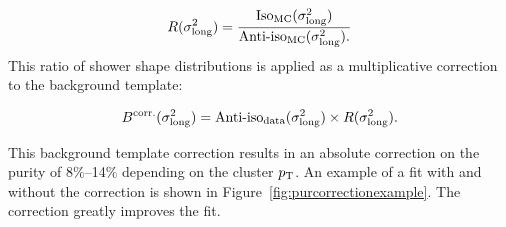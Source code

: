 
\begin{equation}
    R(\sigma^{2}_{\mathrm{long}})=\frac{\text{Iso}_{\text{MC}}(\sigma^{2}_{\mathrm{long}})}{\text{Anti-iso}_{\text{MC}}(\sigma^{2}_{\mathrm{long}}).}
    \label{eq:bkgtemplateweights}
\end{equation}
This ratio of shower shape distributions is applied as a multiplicative correction to the background template:

\begin{equation}
    B^{\text{corr.}}(\sigma^{2}_{\mathrm{long}})=\text{Anti-iso}_{\text{data}}(\sigma^{2}_{\mathrm{long}})\times R(\sigma^{2}_{\mathrm{long}}).
    \label{eq:bkgtemplatecorrection}
\end{equation}

This background template correction results in an absolute correction on the purity of 8$\%$--14$\%$ depending on the cluster $p_{\mathrm{T}}$. An example of a fit with and without the correction is shown in Figure~\ref{fig:purcorrectionexample}. The correction greatly improves the fit. 




